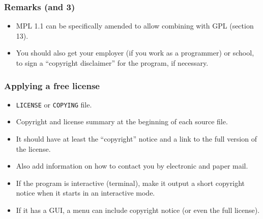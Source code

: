 
\begin{frame}
\frametitle{Remarks (and 3)}

\begin{itemize}
\item MPL 1.1 can be specifically amended to allow combining with GPL (section 13).
\item You should also get your employer (if you work as a programmer) or school, to sign a ``copyright disclaimer'' for the program, if necessary. 
\end{itemize}

\end{frame}



\begin{frame}
\frametitle{Applying a free license}


\begin{itemize}
\item \texttt{LICENSE} or \texttt{COPYING} file.
\item Copyright and license summary at the beginning of each source file.
\item It should have at least the ``copyright'' notice and a link to the full version of the license.
\item Also add information on how to contact you by electronic and paper mail.
\item If the program is interactive (terminal), make it output a short copyright notice 
when it starts in an interactive mode.
\item If it has a GUI, a menu can include copyright notice (or even the full license).
\end{itemize}

\end{frame}


